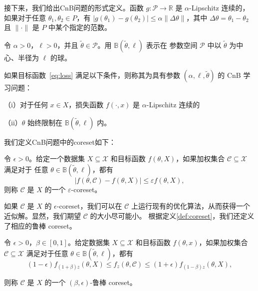接下来，我们给出CnB问题的形式定义。函数 $g: \mathcal{P} \rightarrow \mathbb{R}$ 是 $\alpha$-Lipschitz 连续的，如果对于任意 $\theta_1, \theta_2 \in P$，有 $|g(\theta_1) - g(\theta_2)| \leq \alpha \|\Delta \theta\|$，其中 $\Delta \theta = \theta_1 - \theta_2$ 且 $\|\cdot\|$ 是 $P$ 中某个指定的范数。


\begin{definition}[CnB 问题]
  令 $\alpha > 0$，$\ell > 0$，并且 $\tilde{\theta} \in \mathcal{P}$。用 $\mathbb{B}(\tilde{\theta}, \ell)$ 表示在
  参数空间 $\mathcal{P}$ 中以 $\tilde{\theta}$ 为中心、半径为 $\ell$ 的球。

如果目标函数~\eqref{eq:loss} 满足以下条件，则称其为具有参数 $(\alpha, \ell, \tilde{\theta})$ 的 CnB 学习问题：

（i）对于任何 $x \in X$，损失函数 $f(\cdot, x)$ 是 $\alpha$-Lipschitz 连续的

（ii）$\theta$ 始终限制在 $\mathbb{B}(\tilde{\theta}, \ell)$ 内。
\end{definition}

我们定义CnB问题中的coreset如下：

\begin{definition}
  令 $\epsilon > 0$。给定一个数据集 $X \subseteq \mathcal{X}$ 
  和目标函数 $f(\theta, X)$，如果加权集合 $\mathcal{C} \subseteq \mathcal{X}$ 满足对于
  任意 $\theta \in \mathbb{B}(\tilde{\theta}, \ell)$，都有
  \begin{equation*}
  |f(\theta, \mathcal{C}) - f(\theta, X)| \leq \varepsilon f(\theta, X),
  \end{equation*}
则称 $\mathcal{C}$ 是 $X$ 的一个 $\varepsilon$-coreset。
\label{def:coreset}
\end{definition}


如果 $\mathcal{C}$ 是 $X$ 的 $\epsilon$-coreset，我们可以在 $\mathcal{C}$ 上运行现有的优化算法，从而获得一个近似解。显然，我们期望 $\mathcal{C}$ 的大小尽可能小。
根据定义\ref{def:coreset}，我们还定义了相应的鲁棒 coreset。


\begin{definition}[鲁棒coreset]
  令 $\epsilon > 0$，$\beta \in [0, 1]$。给定数据集 $X \subseteq \mathcal{X}$ 
  和目标函数 $f(\theta, x)$，如果加权集合 $\mathcal{C} \subseteq \mathcal{X}$ 满足对于任意 $\theta \in \mathbb{B}(\tilde{\theta}, \ell)$，都有
  \begin{equation*}
  (1 - \epsilon) f_{(1+\beta)z}(\theta, X) \leq f_z(\theta, \mathcal{C}) \leq (1 + \epsilon) f_{(1-\beta)z}(\theta, X),
  \end{equation*}

则称 $\mathcal{C}$ 是 $X$ 的一个 $(\beta, \epsilon)$-鲁棒 coreset。
\label{def:robust coreset}
\end{definition}


